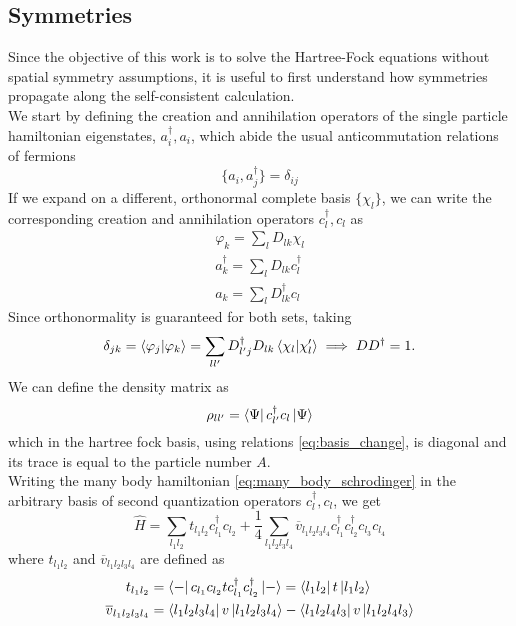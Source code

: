 \subsection{Symmetries}
Since the objective of this work is to solve the Hartree-Fock equations without spatial symmetry assumptions, it is useful to first understand how symmetries propagate along the self-consistent calculation.
\\We start by defining the creation and annihilation operators of the single particle hamiltonian eigenstates, $a_i^\dagger, a_i$, which abide the usual anticommutation relations of fermions
\begin{equation}
    \label{eq:fermion_anticommutations}
    \{a_i, a_j^\dagger\} = \delta_{ij}
\end{equation}
If we expand on a different, orthonormal complete basis $\{\chi_l\}$, we can write the corresponding creation and annihilation operators $c_l^\dagger, c_l$ as
\begin{align}
    \label{eq:basis_change}
    \varphi_k = \sum_l D_{lk} \chi_l\\
    a_k^\dagger = \sum_l D_{lk} c_l^\dagger\\
    a_k = \sum_l D_{lk}^\dagger c_l
\end{align}
Since orthonormality is guaranteed for both sets, taking 
\begin{equation}
    \delta_{jk} = \bra{\varphi_j}\ket{\varphi_k} = \sum_{ll'} D_{l'j}^\dagger D_{lk}\bra{\chi_l}\ket{\chi_l'}\implies DD^\dagger = 1.
\end{equation}
We can define the density matrix as
\begin{equation}
    \label{eq:density_op}
    \rho_{ll'} = \bra{\Psi}c_{l'}^\dagger c_l\ket{\Psi}
\end{equation}
which in the hartree fock basis, using relations \ref{eq:basis_change}, is diagonal and its trace is equal to the particle number $A$.
\\Writing the many body hamiltonian \ref{eq:many_body_schrodinger} in the arbitrary basis of second quantization operators $c_l^\dagger, c_l$, we get
\begin{equation}
    \label{eq:mb_hamiltonian_sq}
    \hat H = \sum_{l_1 l_2}t_{l_1l_2} c_{l_1}^\dagger c_{l_2} + \frac 1 4 \sum_{l_1 l_2 l_3 l_4}\overline{v}_{l_1l_2l_3l_4} c_{l_1}^\dagger c_{l_2}^\dagger c_{l_3} c_{l_4}
\end{equation}
where $t_{l_1l_2}$ and $\overline{v}_{l_1 l_2 l_3 l_4}$ are defined as 
\begin{align}
    \label{eq:t_op}
    t_{l_1l_2} &= \bra{-}c_{l_1}c_{l_2} t c_{l_1}^\dagger c_{l_2}^\dagger \ket{-} = \bra{l_1 l_2}t\ket{l_1 l_2}
    \\ \overline{v}_{l_1 l_2 l_3 l_4} &= \bra{l_1 l_2 l_3 l_4} v \ket{l_1 l_2 l_3 l_4} - \bra{l_1 l_2 l_4 l_3} v \ket{l_1 l_2 l_4 l_3}
\end{align}
